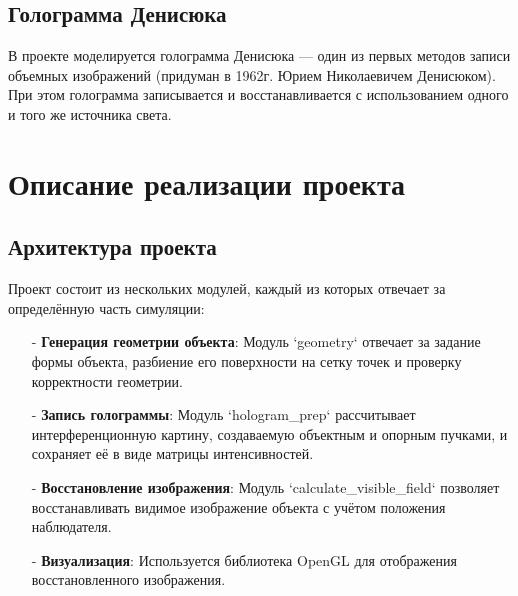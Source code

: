\documentclass[aps,twocolumn,secnumarabic,balancelastpage,amsmath,amssymb,nofootinbib, floatfix]{revtex4-1}
\begin{document}
\subsection{Голограмма Денисюка }

В проекте моделируется голограмма Денисюка — один из первых методов записи объемных изображений (придуман в 1962г. Юрием Николаевичем Денисюком). При этом голограмма записывается и восстанавливается с использованием одного и того же источника света.  

\section{Описание реализации проекта } 

\subsection{Архитектура проекта }

Проект состоит из нескольких модулей, каждый из которых отвечает за определённую часть симуляции:  
\begin{enumerate}
\item[-]\textbf{Генерация геометрии объекта}:  
Модуль `geometry` отвечает за задание формы объекта, разбиение его поверхности на сетку точек и проверку корректности геометрии.  

\item[-]\textbf{Запись голограммы}:  
Модуль `hologram\_prep` рассчитывает интерференционную картину, создаваемую объектным и опорным пучками, и сохраняет её в виде матрицы интенсивностей.  

\item[-]\textbf{Восстановление изображения}:  
Модуль `calculate\_visible\_field` позволяет восстанавливать видимое изображение объекта с учётом положения наблюдателя.  

\item[-]\textbf{Визуализация}:  
Используется библиотека OpenGL для отображения восстановленного изображения.  
\end{enumerate}
\end{document}
